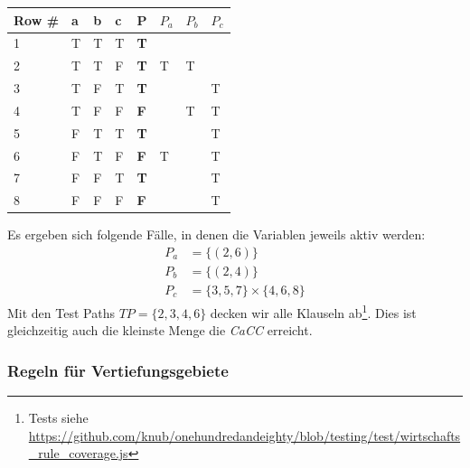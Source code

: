 \documentclass[ngerman]{article}
\begin{document}
\begin{table}
\begin{tabular}{|l|l|l|l|l|l|l|l|}
\hline
\textbf{Row \#} & \textbf{a} & \textbf{b} & \textbf{c} & \textbf{P} & \textbf{$P_a$} & \textbf{$P_b$} & \textbf{$P_c$} \\
\hline \hline
 1              & T          & T          & T          & \textbf{T} &                &                &                \\
 2              & T          & T          & F          & \textbf{T} & T              &   T            &                \\
 3              & T          & F          & T          & \textbf{T} &                &                & T              \\
 4              & T          & F          & F          & \textbf{F} &                &   T            & T              \\
 5              & F          & T          & T          & \textbf{T} &                &                & T              \\
 6              & F          & T          & F          & \textbf{F} & T              &                & T              \\
 7              & F          & F          & T          & \textbf{T} &                &                & T              \\
 8              & F          & F          & F          & \textbf{F} &                &                & T              \\
\end{tabular}
\end{table}

Es ergeben sich folgende Fälle, in denen die Variablen jeweils aktiv werden:
\begin{align}
    P_a &= \{ (2, 6) \} \\
    P_b &= \{ (2, 4) \} \\
    P_c &= \{ 3, 5, 7 \} \times \{ 4, 6, 8 \}
\end{align}
Mit den Test Paths $TP = \{ 2, 3, 4, 6 \}$ decken wir alle Klauseln ab\footnote{Tests siehe \url{https://github.com/knub/onehundredandeighty/blob/testing/test/wirtschafts_rule_coverage.js}}.
Dies ist gleichzeitig auch die kleinste Menge die \emph{CaCC} erreicht.

\subsubsection{Regeln für Vertiefungsgebiete}
\end{document}
